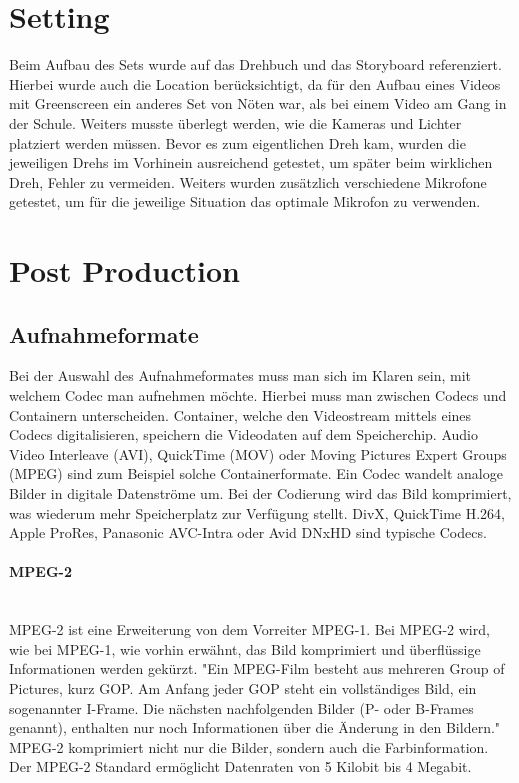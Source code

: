 \section{Setting}
Beim Aufbau des Sets wurde auf das Drehbuch und das Storyboard referenziert. Hierbei wurde auch die Location berücksichtigt, da für den Aufbau eines Videos mit Greenscreen ein anderes Set von Nöten war, als bei einem Video am Gang in der Schule. Weiters musste überlegt werden, wie die Kameras und Lichter platziert werden müssen. Bevor es zum eigentlichen Dreh kam, wurden die jeweiligen Drehs im Vorhinein ausreichend getestet, um später beim wirklichen Dreh, Fehler zu vermeiden. Weiters wurden zusätzlich verschiedene Mikrofone getestet, um für die jeweilige Situation das optimale Mikrofon zu verwenden.
\section{Post Production}
\subsection{Aufnahmeformate}
Bei der Auswahl des Aufnahmeformates muss man sich im Klaren sein, mit welchem Codec man aufnehmen möchte. Hierbei muss man zwischen Codecs und Containern unterscheiden. Container, welche den Videostream mittels eines Codecs digitalisieren, speichern die Videodaten auf dem Speicherchip. Audio Video Interleave (AVI), QuickTime (MOV) oder Moving Pictures Expert Groups (MPEG) sind zum Beispiel solche Containerformate. Ein Codec wandelt analoge Bilder in digitale Datenströme um. Bei der Codierung wird das Bild komprimiert, was wiederum mehr Speicherplatz zur Verfügung stellt. DivX, QuickTime H.264, Apple ProRes, Panasonic AVC-Intra oder Avid DNxHD sind typische Codecs. 
\paragraph{MPEG-2}
\leavevmode \\
MPEG-2 ist eine Erweiterung von dem Vorreiter MPEG-1. Bei MPEG-2 wird, wie bei MPEG-1, wie vorhin erwähnt, das Bild komprimiert und überflüssige Informationen werden gekürzt. "Ein MPEG-Film besteht aus mehreren Group of Pictures, kurz GOP. Am Anfang jeder GOP steht ein vollständiges Bild, ein sogenannter I-Frame. Die nächsten nachfolgenden Bilder (P- oder B-Frames genannt), enthalten nur noch Informationen über die Änderung in den Bildern."
MPEG-2 komprimiert nicht nur die Bilder, sondern auch die Farbinformation.
Der MPEG-2 Standard ermöglicht Datenraten von 5 Kilobit bis 4 Megabit. 
